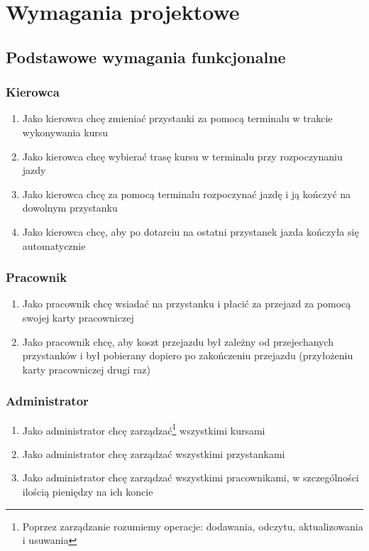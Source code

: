 \section{Wymagania projektowe}
\subsection{Podstawowe wymagania funkcjonalne}
\subsubsection{Kierowca}
\begin{enumerate}
  \item{Jako kierowca chcę zmieniać przystanki za pomocą terminalu w trakcie wykonywania kursu}
  \item{Jako kierowca chcę wybierać trasę kursu w terminalu przy rozpoczynaniu jazdy}
  \item{Jako kierowca chcę za pomocą terminalu rozpoczynać jazdę i ją kończyć na dowolnym przystanku}
  \item{Jako kierowca chcę, aby po dotarciu na ostatni przystanek jazda kończyła się automatycznie}
\end{enumerate}
\subsubsection{Pracownik}
\begin{enumerate}[resume]
  \item{Jako pracownik chcę wsiadać na przystanku i płacić za przejazd za pomocą swojej karty pracowniczej}
  \item{Jako pracownik chcę, aby koszt przejazdu był zależny od przejechanych przystanków i był pobierany dopiero po zakończeniu przejazdu (przyłożeniu karty pracowniczej drugi raz)}
\end{enumerate}
\subsubsection{Administrator}
\begin{enumerate}[resume]
  \item{Jako administrator chcę zarządzać\footnote{Poprzez zarządzanie rozumiemy operacje: dodawania, odczytu, aktualizowania i usuwania} wszystkimi kursami}
  \item{Jako administrator chcę zarządzać wszystkimi przystankami}
  \item{Jako administrator chcę zarządzać wszystkimi pracownikami, w szczególności ilością pieniędzy na ich koncie}
\end{enumerate}
